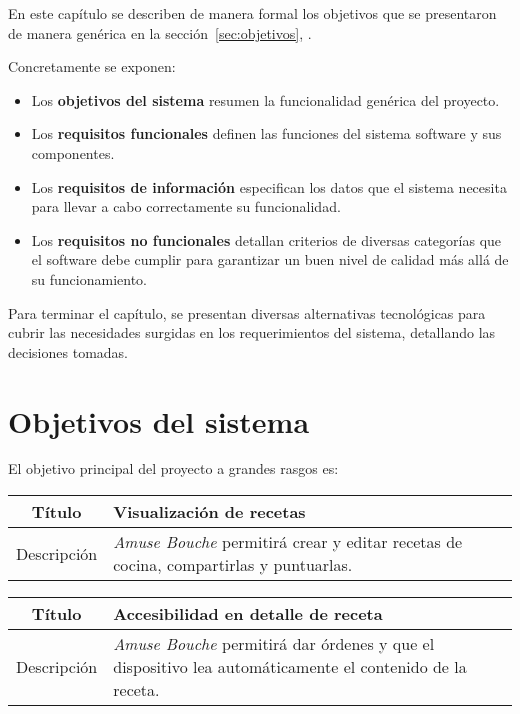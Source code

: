 
En este capítulo se describen de manera formal los objetivos que se presentaron
de manera genérica en la sección~\ref{sec:objetivos},
\textit{}. 

Concretamente se exponen:

\begin{itemize}
\item Los \textbf{objetivos del sistema} resumen la funcionalidad genérica del
 proyecto.
\item Los \textbf{requisitos funcionales} definen las funciones del sistema
  software y sus componentes.
\item Los \textbf{requisitos de información} especifican los datos que el
  sistema necesita para llevar a cabo correctamente su funcionalidad.
\item Los \textbf{requisitos no funcionales} detallan criterios de diversas
  categorías que el software debe cumplir para garantizar un buen nivel de
  calidad más allá de su funcionamiento.
\end{itemize}

Para terminar el capítulo, se presentan diversas alternativas tecnológicas para
cubrir las necesidades surgidas en los requerimientos del sistema, detallando
las decisiones tomadas.


\section{Objetivos del sistema}

El objetivo principal del proyecto a grandes rasgos es:

\begin{center}
  
  \begin{tabularx}{\textwidth}{|c|X|}
    \hline
    Título & Visualización de recetas \\

    \hline

    Descripción & \textit{Amuse Bouche} permitirá crear y editar recetas de
    cocina, compartirlas y puntuarlas.\\

    \hline
  \end{tabularx}
\end{center}

\begin{center}
  
  \begin{tabularx}{\textwidth}{|c|X|}
    \hline
    Título & Accesibilidad en detalle de receta \\

    \hline

    Descripción & \textit{Amuse Bouche} permitirá dar órdenes y que el
    dispositivo lea automáticamente el contenido de la receta.\\

    \hline
  \end{tabularx}
\end{center}

